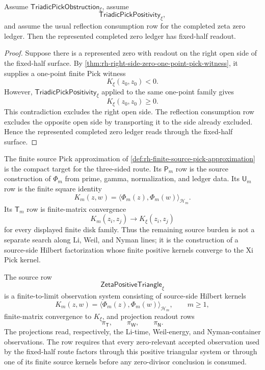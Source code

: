 \begin{theorem}
\label{thm:rh-triadic-pick-obstruction-fixed-half-readout}
Assume $\mathsf{TriadicPickObstruction}_{\xi}$, assume
$$
\mathsf{TriadicPickPositivity}_{\xi},
$$
and assume the usual reflection consumption row for the completed zeta
zero ledger.  Then the represented completed zero ledger has fixed-half
readout.
\end{theorem}

\begin{proof}
Suppose there is a represented zero with readout on the right open side
of the fixed-half surface.  By
\autoref{thm:rh-right-side-zero-one-point-pick-witness}, it supplies a
one-point finite Pick witness
$$
K_{\xi}(z_0,z_0)<0.
$$
However, $\mathsf{TriadicPickPositivity}_{\xi}$ applied to the same
one-point family gives
$$
K_{\xi}(z_0,z_0)\ge0.
$$
This contradiction excludes the right open side.  The reflection
consumption row excludes the opposite open side by transporting it to
the side already excluded.  Hence the represented completed zero ledger
reads through the fixed-half surface.
\end{proof}

\begin{principle}
\label{prin:rh-pick-tower-common-triangular-target}
The finite source Pick approximation of
\autoref{def:rh-finite-source-pick-approximation} is the compact
target for the three-sided route.  Its $\mathsf P_m$ row is the
source construction of $\Phi_m$ from prime, gamma, normalization, and
ledger data.  Its $\mathsf U_m$ row is the finite square identity
$$
K_m(z,w)=\langle\Phi_m(z),\Phi_m(w)\rangle_{\mathcal H_m}.
$$
Its $\mathsf T_m$ row is finite-matrix convergence
$$
K_m(z_i,z_j)\to K_{\xi}(z_i,z_j)
$$
for every displayed finite disk family.  Thus the remaining source
burden is not a separate search along Li, Weil, and Nyman lines; it is
the construction of a source-side Hilbert factorization whose finite
positive kernels converge to the Xi Pick kernel.
\end{principle}

\begin{definition}
\label{def:rh-zeta-positive-triangular-observation-system}
The source row
$$
\mathsf{ZetaPositiveTriangle}_{\xi}
$$
is a finite-to-limit observation system consisting of source-side
Hilbert kernels
$$
K_m(z,w)=\langle\Phi_m(z),\Phi_m(w)\rangle_{\mathcal H_m},
\qquad
m\ge1,
$$
finite-matrix convergence to $K_{\xi}$, and projection readout rows
$$
\pi_{\mathsf T},
\qquad
\pi_{\mathsf W},
\qquad
\pi_{\mathsf N}.
$$
The projections read, respectively, the Li-time, Weil-energy, and
Nyman-container observations.  The row requires that every
zero-relevant accepted observation used by the fixed-half route factors
through this positive triangular system or through one of its finite
source kernels before any zero-divisor conclusion is consumed.
\end{definition}

